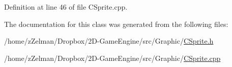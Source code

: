 Definition at line 46 of file C\-Sprite.\-cpp.



The documentation for this class was generated from the following files\-:\begin{DoxyCompactItemize}
\item 
/home/z\-Zelman/\-Dropbox/2\-D-\/\-Game\-Engine/src/\-Graphic/\hyperlink{CSprite_8h}{C\-Sprite.\-h}\item 
/home/z\-Zelman/\-Dropbox/2\-D-\/\-Game\-Engine/src/\-Graphic/\hyperlink{CSprite_8cpp}{C\-Sprite.\-cpp}\end{DoxyCompactItemize}
